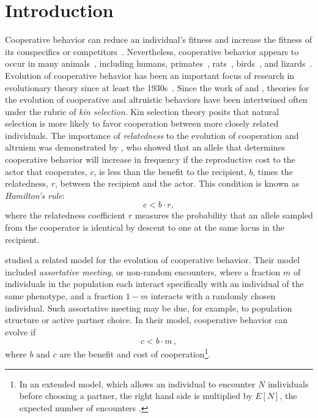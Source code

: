 \documentclass[12pt]{extarticle}
\begin{document}
\section*{Introduction}
Cooperative behavior can reduce an individual's fitness and increase the fitness of its conspecifics or competitors~\citep{axelrod1981evolution}.
Nevertheless, cooperative behavior appears to occur in many animals~\citep{dugatkin1997cooperation}, including humans, primates~\citep{jaeggi2013natural},  rats~\citep{rice1962altruism}, birds~\citep{stacey1990cooperative,krams2008experimental}, and lizards~\citep{sinervo2006self}.
Evolution of cooperative behavior has been an important focus of research in evolutionary theory since at least the 1930s~\citep{Haldane1932book}.
Since the work of  \citet{hamilton1964genetical} and \citet{axelrod1981evolution}, theories for the evolution of cooperative and altruistic behaviors have been intertwined often under the rubric of \emph{kin selection}.
Kin selection theory posits that natural selection is more likely to favor cooperation between more closely related individuals.
The importance of \emph{relatedness} to the evolution of cooperation and altruism was demonstrated by \citet{hamilton1964genetical}, who showed that an allele that determines cooperative behavior will increase in frequency if the reproductive cost to the actor that cooperates, $c$, is less than the benefit to the recipient, $b$, times the relatedness, $r$, between the recipient and the actor.
This condition is  known as \emph{Hamilton's rule}:
\begin{equation} \label{eq:hamilton_rule}
c < b \cdot r,
\end{equation}
where the relatedness coefficient $r$ measures the probability that an allele sampled from the cooperator is identical by descent to one at the same locus in the recipient.

\citet{Eshel1982} studied a related model for the evolution of cooperative behavior.
Their model included \emph{assortative meeting}, or non-random encounters, where a fraction $m$ of individuals in the population each interact specifically with an individual of the same phenotype, and a fraction $1-m$ interacts  with a randomly chosen individual.  
Such assortative meeting may be due, for example, to population structure or active partner choice.
In their model, cooperative behavior can evolve if
\citep[eq.~3.2]{Eshel1982}
\begin{equation} \label{eq:eshel1982}
c < b \cdot m \,,
\end{equation}
where $b$ and $c$ are the benefit and cost of cooperation\footnote{In an extended model, which allows an individual to encounter $N$ individuals before choosing a partner, the right hand side is multiplied by $E[N]$, the expected number of encounters \citep[eq.~4.6]{Eshel1982}.
}. 
\end{document}

